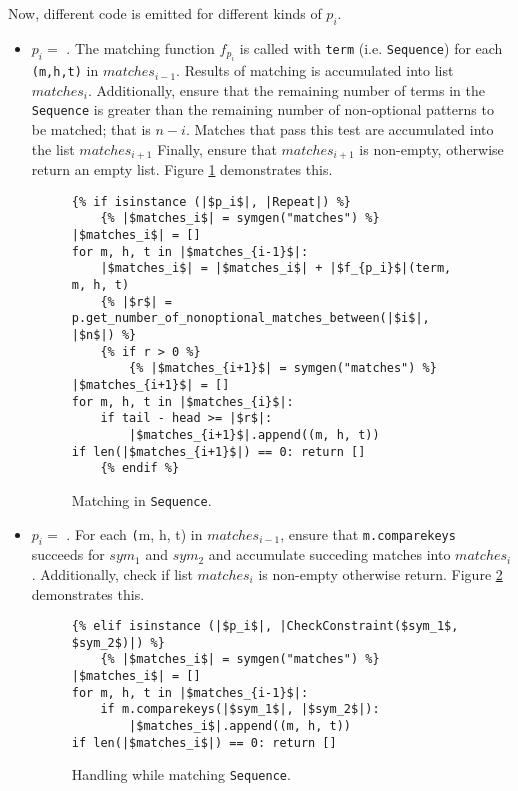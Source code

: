 Now, different code is emitted for different kinds of $p_i$.

\begin{itemize}
\item $p_i=$ \PatternRepeat. The matching function $f_{p_i}$ is called with \texttt{term} (i.e. \texttt{Sequence}) for each \texttt{(m,h,t)} in $matches_{i-1}$. Results of matching is accumulated into list $matches_{i}$. Additionally, ensure that the remaining number of terms in the \texttt{Sequence} is greater than the remaining number of non-optional patterns to be matched; that is $n-i$. Matches that pass this test are accumulated into the list $matches_{i+1}$ Finally, ensure that $matches_{i+1}$ is non-empty, otherwise return an empty list. Figure \ref{codegen-pattern-seq-2} demonstrates this.

\begin{figure}[htb]
\centering
\begin{verbatim}
{% if isinstance (|$p_i$|, |Repeat|) %}
	{% |$matches_i$| = symgen("matches") %}
|$matches_i$| = []
for m, h, t in |$matches_{i-1}$|:
	|$matches_i$| = |$matches_i$| + |$f_{p_i}$|(term, m, h, t)
	{% |$r$| = p.get_number_of_nonoptional_matches_between(|$i$|, |$n$|) %}
	{% if r > 0 %}
		{% |$matches_{i+1}$| = symgen("matches") %}
|$matches_{i+1}$| = []
for m, h, t in |$matches_{i}$|:
	if tail - head >= |$r$|:
		|$matches_{i+1}$|.append((m, h, t))
if len(|$matches_{i+1}$|) == 0: return []
	{% endif %}
\end{verbatim}
\caption{Matching \RepeatNoArg \space in \texttt{Sequence}.}
\label{codegen-pattern-seq-2}
\end{figure}

\item $p_i=$ \PatternCheckConstraint. For each \texttt(m, h, t) in $matches_{i-1}$, ensure that \texttt{m.comparekeys} succeeds for $sym_1$ and $sym_2$ and accumulate succeding matches into $matches_{i}$. Additionally, check if list $matches_{i}$ is non-empty otherwise return. Figure \ref{codegen-pattern-seq-3} demonstrates this.


\begin{figure}[htb]
\centering
\begin{verbatim}
{% elif isinstance (|$p_i$|, |CheckConstraint($sym_1$, $sym_2$)|) %}
	{% |$matches_i$| = symgen("matches") %}
|$matches_i$| = []
for m, h, t in |$matches_{i-1}$|:
	if m.comparekeys(|$sym_1$|, |$sym_2$|):
		|$matches_i$|.append((m, h, t))
if len(|$matches_i$|) == 0: return []
\end{verbatim}
\caption{Handling \ConstraintCheckNoArg \space while matching \texttt{Sequence}.}
\label{codegen-pattern-seq-3}
\end{figure}


\end{itemize}
